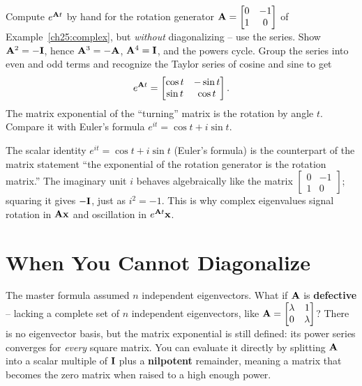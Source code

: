 \begin{labbox}
Compute $e^{\mathbf{A}t}$ by hand for the rotation generator
$\mathbf{A}=\begin{bmatrix}0&-1\\1&0\end{bmatrix}$ of Example~\ref{ch25:complex}, but
\emph{without} diagonalizing -- use the series. Show $\mathbf{A}^2=-\mathbf{I}$, hence
$\mathbf{A}^3=-\mathbf{A}$, $\mathbf{A}^4=\mathbf{I}$, and the powers cycle. Group the series
into even and odd terms and recognize the Taylor series of cosine and sine to get
\[
  e^{\mathbf{A}t} = \begin{bmatrix}\cos t & -\sin t\\ \sin t & \cos t\end{bmatrix}.
\]
The matrix exponential of the ``turning'' matrix is the rotation by angle $t$.
Compare it with Euler's formula $e^{i t} = \cos t + i\sin t$.
\end{labbox}

\begin{aestheticbox}
The scalar identity $e^{it}=\cos t + i\sin t$
(Euler's formula) is the
counterpart of the matrix statement ``the exponential of the rotation generator is the
rotation matrix.'' The imaginary unit $i$ behaves algebraically like the matrix
$\begin{bmatrix}0&-1\\1&0\end{bmatrix}$; squaring it gives $-\mathbf{I}$,
just as $i^2=-1$. This is why complex eigenvalues signal rotation in
$\mathbf{A}\mathbf{x}$ and oscillation in $e^{\mathbf{A}t}\mathbf{x}$.
\end{aestheticbox}

\section{When You Cannot Diagonalize}
\label{ch25:defective}

The master formula assumed $n$ independent eigenvectors. What if $\mathbf{A}$ is
\textbf{defective} -- lacking a complete set of $n$ independent eigenvectors, like
$\mathbf{A}=\begin{bmatrix}\lambda&1\\0&\lambda\end{bmatrix}$? There is no
eigenvector basis, but the matrix exponential is still defined: its
power series converges for \emph{every} square matrix. You can evaluate it directly by
splitting $\mathbf{A}$ into a scalar multiple of $\mathbf{I}$ plus a \textbf{nilpotent} remainder,
meaning a matrix that becomes the zero matrix when raised to a high enough power.

